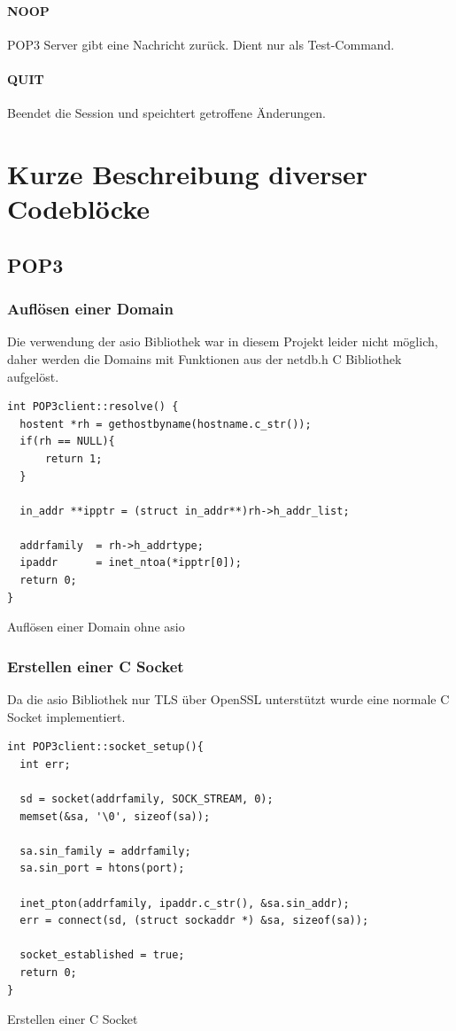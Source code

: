 \documentclass[12pt, letterpaper]{article}
\newenvironment{code}{\captionsetup{type=listing}}{}
\begin{document}
\paragraph{NOOP}
POP3 Server gibt eine Nachricht zurück. Dient nur als Test-Command.

\paragraph{QUIT}
Beendet die Session und speichtert getroffene Änderungen.

\section{Kurze Beschreibung diverser Codeblöcke}

\subsection{POP3}

\subsubsection{Auflösen einer Domain}

Die verwendung der asio Bibliothek war in diesem Projekt leider nicht möglich, daher werden die Domains mit Funktionen aus der netdb.h C Bibliothek aufgelöst.

\begin{code}
\begin{verbatim}
int POP3client::resolve() {
  hostent *rh = gethostbyname(hostname.c_str());
  if(rh == NULL){
      return 1;
  }

  in_addr **ipptr = (struct in_addr**)rh->h_addr_list;

  addrfamily  = rh->h_addrtype;
  ipaddr      = inet_ntoa(*ipptr[0]);
  return 0;
}
\end{verbatim}
\caption{Auflösen einer Domain ohne asio}
\label{resolve_domain}
\end{code}

\subsubsection{Erstellen einer C Socket}

Da die asio Bibliothek nur TLS über OpenSSL unterstützt wurde eine normale C Socket implementiert. 

\begin{code}
\begin{verbatim}
int POP3client::socket_setup(){
  int err;

  sd = socket(addrfamily, SOCK_STREAM, 0);
  memset(&sa, '\0', sizeof(sa));

  sa.sin_family = addrfamily;
  sa.sin_port = htons(port);

  inet_pton(addrfamily, ipaddr.c_str(), &sa.sin_addr);
  err = connect(sd, (struct sockaddr *) &sa, sizeof(sa));

  socket_established = true;
  return 0;
}
\end{verbatim}
\caption{Erstellen einer C Socket}
\label{create_c_socket}
\end{code}
\end{document}
